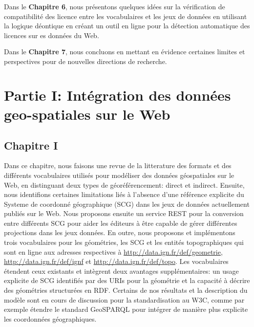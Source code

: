 Dans le \textbf{Chapitre 6}, nous pr\'{e}sentons quelques id\'{e}es sur la v\'{e}rification de compatibilit\'{e} des licence entre les vocabulaires et les jeux de donn\'{e}es en utilisant la logique d\'{e}ontique en cr\'{e}ant un outil en ligne pour la d\'{e}tection automatique des licences sur es donn\'{e}es du Web.

Dans le \textbf{Chapitre 7}, nous concluons en mettant en \'{e}vidence certaines limites et perspectives pour de nouvelles directions de recherche.

\section*{Partie I: Int\'{e}gration des donn\'{e}es geo-spatiales sur le Web}

\subsection*{Chapitre I}
Dans ce chapitre, nous faisons une revue de la litterature des formats et des diff\'{e}rents vocabulaires utilis\'{e}s pour mod\'{e}liser des donn\'{e}es g\'{e}ospatiales sur le Web, en distinguant deux types de g\'{e}or\'{e}f\'{e}rencement: direct et indirect. Ensuite, nous identifions certaines limitations li\'{e}s \`{a} l'absence d'une r\'{e}f\'{e}rence explicite du Systeme de coordonn\'{e} g\'{e}ographique (SCG) dans les jeux de donn\'{e}es actuellement publi\'{e}s sur le Web. Nous proposons ensuite un service REST pour la conversion entre diff\'{e}rents SCG pour aider les \'{e}diteurs \`{a} \^{e}tre capable de g\'{e}rer diff\'{e}rentes projections dans les jeux donn\'{e}es. En outre, nous proposons et impl\'{e}mentons trois vocabulaires pour les g\'{e}om\'{e}tries, les SCG et les entit\'{e}s topographiques qui sont en ligne aux adresses respectives \`{a} \url{http://data.ign.fr/def/geometrie}, \url{http://data.ign.fr/def/ignf} et \url{http://data.ign.fr/def/topo}. Les vocabulaires \'{e}tendent ceux existants et int\`{e}grent deux avantages suppl\'{e}mentaires: un usage explicite de SCG identifi\'{e}s par des URIs pour la g\'{e}om\'{e}trie et la capacit\'{e} \`{a} d\'{e}crire des g\'{e}om\'{e}tries structur\'{e}es en RDF. Certains de nos r\'{e}sultats et la description du mod\`{e}le sont en cours de discussion pour la standardisation au W3C, comme par exemple \'{e}tendre le standard  GeoSPARQL pour int\'{e}grer de mani\`{e}re plus explicite les coordonn\'{e}es g\'{e}ographiques.

